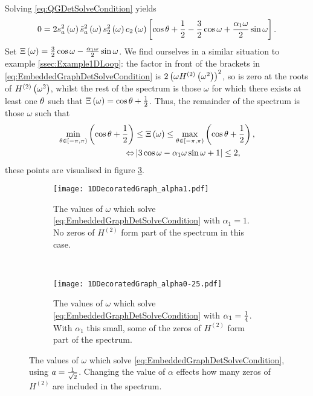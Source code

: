 Solving \eqref{eq:QGDetSolveCondition} yields
\begin{align} \label{eq:EmbeddedGraphDetSolveCondition}
	0 = 2s_a^2\left( \omega \right) \tilde{s}_a^2\left( \omega \right) s_2^2\left( \omega \right) c_2\left( \omega \right)
	\left[  \cos\theta + \frac{1}{2} - \frac{3}{2}\cos\omega + \frac{\alpha_1\omega}{2}\sin\omega  \right].
\end{align}
Set $\Xi\left( \omega \right) = \frac{3}{2}\cos\omega - \frac{\alpha_1\omega}{2}\sin\omega$.
We find ourselves in a similar situation to example \ref{ssec:Example1DLoop}: the factor in front of the brackets in \eqref{eq:EmbeddedGraphDetSolveCondition} is $2\left(  \omega H^{(2)}\left( \omega^2 \right)  \right)^2$, so is zero at the roots of $H^{(2)}\left( \omega^2 \right)$, whilst the rest of the spectrum is those $\omega$ for which there exists at least one $\theta$ such that $\Xi\left( \omega \right) = \cos\theta + \frac{1}{2}$.
Thus, the remainder of the spectrum is those $\omega$ such that
\begin{align*}
	\min_{\theta\in\left[-\pi,\pi\right)}\left( \cos\theta + \frac{1}{2} \right) &\leq \Xi\left( \omega \right) 
	\leq \max_{\theta\in\left[-\pi,\pi\right)} \left( \cos\theta + \frac{1}{2} \right), \\
	\Leftrightarrow & \left\lvert  3\cos\omega - \alpha_1\omega\sin\omega + 1  \right\rvert \leq 2, 
\end{align*}
these points are visualised in figure \ref{fig:1DDecoratedGraph}.
\begin{figure}[b!]
	\centering
	\begin{subfigure}[t]{0.45\textwidth}
		\centering
		\texttt{[image: 1DDecoratedGraph\_alpha1.pdf]}
		\caption{\label{fig:1DDecoratedGraph_alpha1} The values of $\omega$ which solve \eqref{eq:EmbeddedGraphDetSolveCondition} with $\alpha_1=1$. No zeros of $H^{(2)}$ form part of the spectrum in this case.}
	\end{subfigure}
	~
	\begin{subfigure}[t]{0.45\textwidth}
		\centering
		\texttt{[image: 1DDecoratedGraph\_alpha0-25.pdf]}
		\caption{\label{fig:1DDecoratedGraph_alpha0-25} The values of $\omega$ which solve \eqref{eq:EmbeddedGraphDetSolveCondition} with $\alpha_1=\frac{1}{4}$. With $\alpha_1$ this small, some of the zeros of $H^{(2)}$ form part of the spectrum.}
	\end{subfigure}
	\caption{\label{fig:1DDecoratedGraph} The values of $\omega$ which solve \eqref{eq:EmbeddedGraphDetSolveCondition}, using $a=\frac{1}{\sqrt{2}}$. Changing the value of $\alpha$ effects how many zeros of $H^{(2)}$ are included in the spectrum.}
\end{figure}
